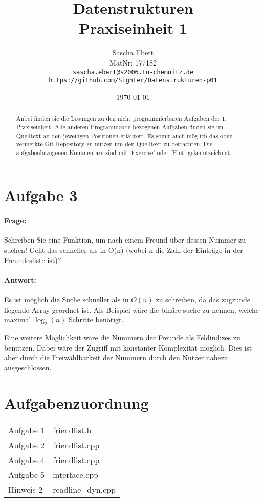 \documentclass{article}
\title{Datenstrukturen\\Praxiseinheit 1}
\author
{
	Sascha Ebert\\
	MatNr: 177182\\
	\texttt{sascha.ebert@s2006.tu-chemnitz.de}\\
	\texttt{https://github.com/Sighter/Datenstrukturen-p01}\\
}
\date{\today}
\begin{document}
\maketitle

\begin{abstract}
Anbei finden sie die Lösungen zu den nicht programmierbaren Aufgaben der 1. Praxiseinheit.
Alle anderen Programmcode-bezogenen Aufgaben finden sie im Quelltext an den jeweiligen Positionen
erläutert. Es somit auch möglich das oben vermerkte Git-Repository zu nutzen um den Quelltext
zu betrachten. Die aufgabenbezogenen Kommentare sind mit `Exercise' oder `Hint' gekenntzeichnet.
\end{abstract}

\section*{Aufgabe 3}
\paragraph{Frage:}
Schreiben Sie eine Funktion, um nach einem Freund über dessen Nummer zu suchen!
Geht das schneller als in O(n) (wobei n die Zahl der Einträge in der Freundesliste ist)?

\paragraph{Antwort:}
Es ist möglich die Suche schneller als in \(O(n)\) zu schreiben, da das zugrunde liegende Array
geordnet ist. Als Beispiel wäre die binäre suche zu nennen, welche maximal \(\log_{2}(n)\) Schritte
benötigt.

Eine weitere Möglichkeit wäre die Nummern der Freunde als Feldindizes zu benutzen. Dabei wäre der Zugriff
mit konstanter Komplexität möglich. Dies ist aber durch die Freiwählbarkeit der Nummern durch den Nutzer
nahezu ausgeschlossen.

\section*{Aufgabenzuordnung}
\begin{tabular}{ l l }
  Aufgabe 1  & friendlist.h \\
  Aufgabe 2  & friendlist.cpp \\
  Aufgabe 4  & friendlist.cpp \\
  Aufgabe 5  & interface.cpp \\
  Hinweis 2  & readline\_dyn.cpp
\end{tabular}
\end{document}
